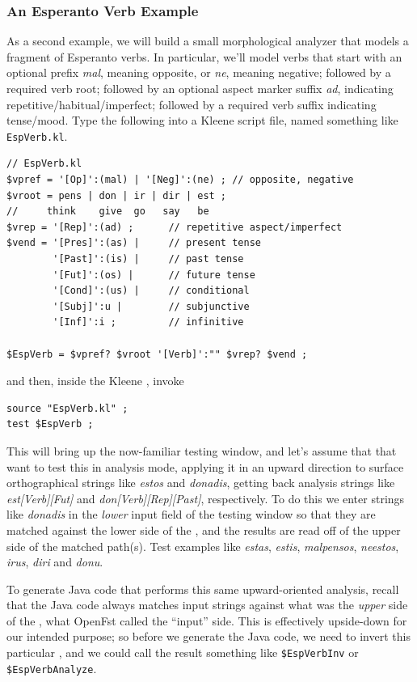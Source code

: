 \subsubsection{An Esperanto Verb Example}

As a second example, we will build a small morphological analyzer \fst{} that models a fragment of
Esperanto verbs.  In particular, we'll model verbs that start with an optional prefix \emph{mal},
meaning opposite, or \emph{ne}, meaning negative; followed by a required verb root; followed by
an optional aspect marker suffix \emph{ad}, indicating repetitive/habitual/imperfect; followed
by a required verb suffix indicating tense/mood.  Type the following into a Kleene script file, named
something like \texttt{EspVerb.kl}.

\begin{Verbatim}
// EspVerb.kl
$vpref = '[Op]':(mal) | '[Neg]':(ne) ; // opposite, negative
$vroot = pens | don | ir | dir | est ;
//     think    give  go   say   be
$vrep = '[Rep]':(ad) ;      // repetitive aspect/imperfect
$vend = '[Pres]':(as) |     // present tense
        '[Past]':(is) |     // past tense
        '[Fut]':(os) |      // future tense
        '[Cond]':(us) |     // conditional
        '[Subj]':u |        // subjunctive
        '[Inf]':i ;         // infinitive

$EspVerb = $vpref? $vroot '[Verb]':"" $vrep? $vend ;
\end{Verbatim}

\noindent
and then, inside the Kleene \gui{}, invoke

\begin{Verbatim}
source "EspVerb.kl" ;
test $EspVerb ;
\end{Verbatim}

This will bring up the now-familiar testing window, and let's assume that that want to test this
\fsm{} in analysis mode, applying it in an upward direction to surface orthographical
strings like \emph{estos} and \emph{donadis}, getting
back analysis strings like \emph{est[Verb][Fut]} and \emph{don[Verb][Rep][Past]}, respectively.  
To do this we enter strings like
\emph{donadis} in the \emph{lower} input field of the testing window so that they are matched against the lower side of the
\fsm{}, and the results are read off of the upper side of the matched path(s).
Test examples like \emph{estas}, \emph{estis}, \emph{malpensos}, \emph{neestos}, \emph{irus}, \emph{diri}  and \emph{donu}.

To generate Java code that performs this same upward-oriented analysis, recall that the Java
code always matches input strings against what was the \emph{upper} side of the \fsm{}, what
OpenFst called the ``input'' side.  This \fsm{} is effectively upside-down for our intended
purpose; so before we generate the Java code, we need to invert this particular \fsm{}, and we
could call the result something like \verb!$EspVerbInv! or \verb!$EspVerbAnalyze!.

